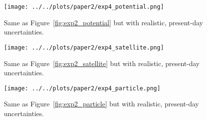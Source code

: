 \documentclass[letterpaper,12pt,preprint]{aastex}
\begin{document}
\begin{figure}[!ht]
\begin{center}
\texttt{[image: ../../plots/paper2/exp4\_potential.png]}
\caption{Same as Figure~\ref{fig:exp2_potential} but with realistic, present-day uncertainties. }\label{fig:exp4_potential}
\end{center}
\end{figure}

\begin{figure}[!ht]
\begin{center}
\texttt{[image: ../../plots/paper2/exp4\_satellite.png]}
\caption{ Same as Figure~\ref{fig:exp2_satellite} but with realistic, present-day uncertainties. }\label{fig:exp4_satellite}
\end{center}
\end{figure}

\begin{figure}[!ht]
\begin{center}
\texttt{[image: ../../plots/paper2/exp4\_particle.png]}
\caption{ Same as Figure~\ref{fig:exp2_particle} but with realistic, present-day uncertainties. }\label{fig:exp4_particle}
\end{center}
\end{figure}
\end{document}
